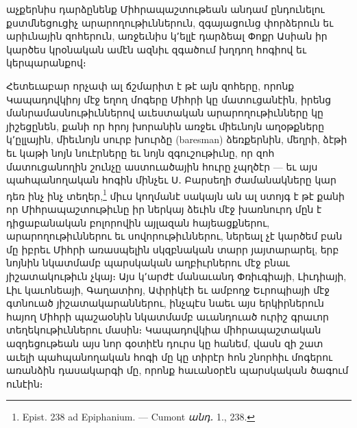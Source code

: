 \documentclass{article}
\begin{document}
{աչքերնիս դարձընենք Միհրապաշտութեան անդամ ընդունելու քստմնեցուցիչ արարողութիւններուն, զգայացունց փորձերուն եւ արիւնային զոհերուն, առջեւնիս կ՚ելլէ դարձեալ Փոքր Ասիան իր կարծես կրօնական ամէն ազնիւ զգածում խղդող հոգիով եւ կերպարանքով։

Հետեւաբար որչափ ալ ճշմարիտ է թէ այն զոհերը, որոնք Կապադովկիոյ մէջ եղող մոգերը Միհրի կը մատուցանէին, իրենց մանրամասնութիւններով աւեստական արարողութիւնները կը յիշեցընեն, քանի որ հրոյ խորանին առջեւ միեւնոյն աղօթքները կ՚ըլլային, միեւնոյն սուրբ խուրձը (baresman) ձեռքերնին, մեղրի, ձէթի եւ կաթի նոյն նուէրները եւ նոյն զգուշութիւնը, որ զոհ մատուցանողին շունչը աստուածային հուրը չպղծէր — եւ այս պահպանողական հոգին մինչեւ Ս․ Բարսեղի ժամանակները կար դեռ ինչ ինչ տեղեր,\footnote{Epist. 238 ad Epiphanium. — Cumont \emph{անդ․} 1., 238.} միւս կողմանէ սակայն ան ալ ստոյգ է թէ քանի որ Միհրապաշտութիւնը իր ներկայ ձեւին մէջ խառնուրդ մըն է դիցաբանական բոլորովին այլազան հայեացքներու, արարողութիւններու եւ սովորութիւններու, ներեալ չէ կարծեմ բան մը իբրեւ Միհրի առասպելին սկզբնական տարր յայտարարել, երբ նոյնին նկատմամբ պարսկական աղբիւրներու մէջ բնաւ յիշատակութիւն չկայ։ Այս կ՚արժէ մանաւանդ Փռիւգիայի, Լիւդիայի, Լիւ կաւոնեայի, Գաղատիոյ, Ափրիկէի եւ ամբողջ Եւրոպիայի մէջ գտնուած յիշատակարաններու, ինչպէս նաեւ այս երկիրներուն հայող Միհրի պաշաօնին նկատմամբ աւանդուած ուրիշ գրաւոր տեղեկութիւններու մասին։ Կապադովկիա միհրապաշտական ազդեցութեան այս նոր գօտիէն դուրս կը հանեմ, վասն զի շատ աւելի պահպանողական հոգի մը կը տիրէր հոն շնորհիւ մոգերու առանձին դասակարգի մը, որոնք հաւանօրէն պարսկական ծագում ունէին։

}
\end{document}
